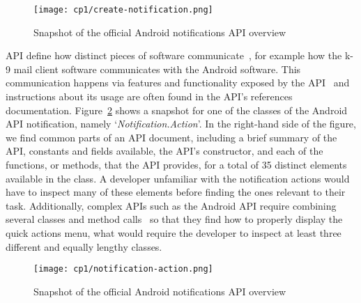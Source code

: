 

\begin{landscape}
\begin{figure}
    \centering
    \texttt{[image: cp1/create-notification.png]}
    \caption{Snapshot of the official Android notifications API overview}
    \label{fig:android-create-notification}
\end{figure}
\end{landscape}


\acf{API} define how  distinct pieces of software communicate~\cite{robillard2011field}, for example how the k-9 mail client software communicates 
with the Android software. This communication happens via features and functionality exposed by the API~\cite{Robillard2015} 
and instructions about its usage are often found in the API's references documentation.
Figure~\ref{fig:android-notification-action} shows a snapshot for one of the classes of the Android API notification, namely `\textit{Notification.Action}'. 
In the right-hand side of the figure, we find common parts of an
API document, including a brief summary of the API,
constants and fields available, the API's constructor, and 
each of the functions, or methods, that the API provides,  
for a total of 35 distinct elements available in the class.
A developer unfamiliar with the notification actions would have to 
inspect many of these elements before finding the ones relevant to
their task. Additionally, complex APIs 
such as the Android API require combining several classes
and method calls~\cite{robillard2011field} so that they find how to properly display the quick actions menu, 
what would require the developer to inspect at least three different and 
equally lengthy classes.








\begin{figure}
    \centering
    \texttt{[image: cp1/notification-action.png]}
    \caption{Snapshot of the official Android notifications API overview}
    \label{fig:android-notification-action}
\end{figure}


